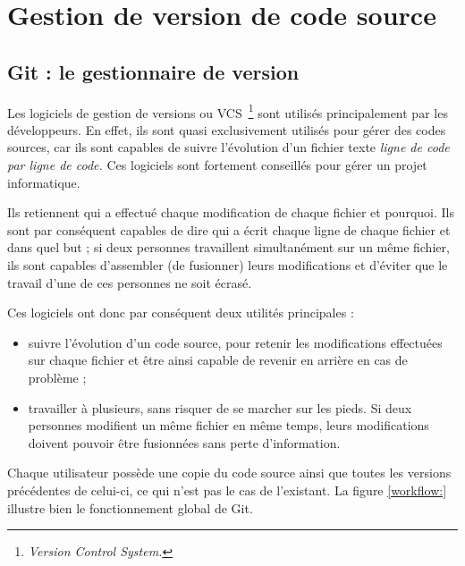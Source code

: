 \chapter{Gestion de version de code source}

\section{Git : le gestionnaire de version}

Les logiciels de gestion de versions ou VCS\, \footnote{\emph{Version Control
System.}} sont utilisés principalement par les développeurs. En effet, ils sont
quasi exclusivement utilisés pour gérer des codes sources, car ils sont
capables de suivre l’évolution d’un fichier texte \emph{ligne de code par ligne de
code.} Ces logiciels sont fortement conseillés pour gérer un projet
informatique.

Ils retiennent qui a effectué chaque modification de chaque fichier et
pourquoi. Ils sont par conséquent capables de dire qui a écrit chaque ligne de
chaque fichier et dans quel but ; si deux personnes travaillent simultanément
sur un même fichier, ils sont capables d’assembler (de fusionner) leurs
modifications et d’éviter que le travail d’une de ces personnes ne soit écrasé.

Ces logiciels ont donc par conséquent deux utilités principales :
\begin{itemize}
    \item suivre l’évolution d’un code source, pour retenir les modifications
effectuées sur chaque fichier et être ainsi capable de revenir en arrière en
cas de problème ;
    \item travailler à plusieurs, sans risquer de se marcher sur les pieds.
Si deux personnes modifient un même fichier en même temps, leurs modifications
doivent pouvoir être fusionnées sans perte d’information.
\end{itemize}

Chaque utilisateur possède une copie du code source ainsi que toutes les
versions précédentes de celui-ci, ce qui n'est pas le cas de l'existant. La
figure \ref{workflow:} illustre bien le fonctionnement global de Git.

